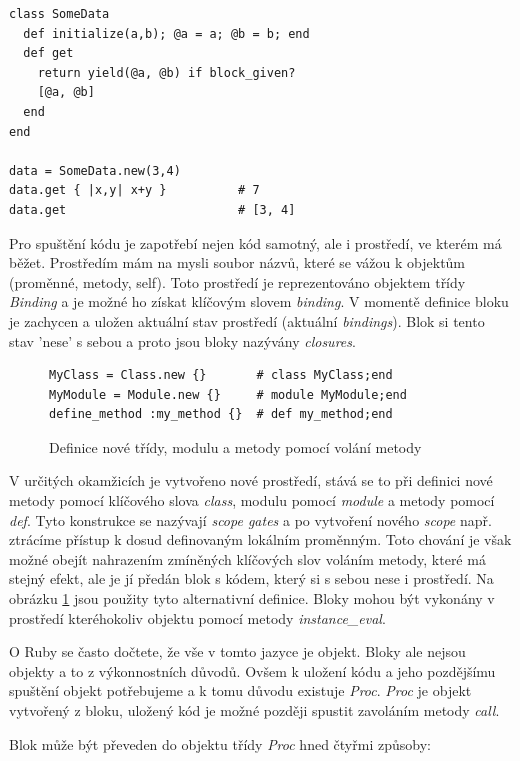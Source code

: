 \documentclass[12pt,a4paper,oneside]{article}
\begin{document}
\begin{lstlisting}[frame=single]
class SomeData
  def initialize(a,b); @a = a; @b = b; end
  def get
    return yield(@a, @b) if block_given?
    [@a, @b]
  end
end

data = SomeData.new(3,4)
data.get { |x,y| x+y }          # 7
data.get                        # [3, 4]
\end{lstlisting}

Pro spuštění kódu je zapotřebí nejen kód samotný, ale i prostředí, ve kterém má běžet. Prostředím mám na mysli soubor názvů, které se vážou k objektům (proměnné, metody, self). Toto prostředí je reprezentováno objektem třídy \emph{Binding} a je možné ho získat klíčovým slovem \emph{binding}. V momentě definice bloku je zachycen a uložen aktuální stav prostředí (aktuální \emph{bindings}). Blok si tento stav 'nese' s sebou a proto jsou bloky nazývány \emph{closures}.

\begin{figure}
\begin{lstlisting}[frame=single]
MyClass = Class.new {}       # class MyClass;end
MyModule = Module.new {}     # module MyModule;end
define_method :my_method {}  # def my_method;end
\end{lstlisting}
\caption{Definice nové třídy, modulu a metody pomocí volání metody}
\label{fig:scope_gates}
\end{figure}

V určitých okamžicích je vytvořeno nové prostředí, stává se to při definici nové metody pomocí klíčového slova \emph{class}, modulu pomocí \emph{module} a metody pomocí \emph{def}. Tyto konstrukce se nazývají \emph{scope gates} a po vytvoření nového \emph{scope} např. ztrácíme přístup k dosud definovaným lokálním proměnným. Toto chování je však možné obejít nahrazením zmíněných klíčových slov voláním metody, které má stejný efekt, ale je jí předán blok s kódem, který si s sebou nese i prostředí. Na obrázku \ref{fig:scope_gates} jsou použity tyto alternativní definice. Bloky mohou být vykonány v prostředí kteréhokoliv objektu pomocí metody \emph{instance\_eval}.

O Ruby se často dočtete, že vše v tomto jazyce je objekt. Bloky ale nejsou objekty a to z výkonnostních důvodů. Ovšem k uložení kódu a jeho pozdějšímu spuštění objekt potřebujeme a k tomu důvodu existuje \emph{Proc}. \emph{Proc} je objekt vytvořený z bloku, uložený kód je možné později spustit zavoláním metody \emph{call}.

Blok může být převeden do objektu třídy \emph{Proc} hned čtyřmi způsoby:
\end{document}
